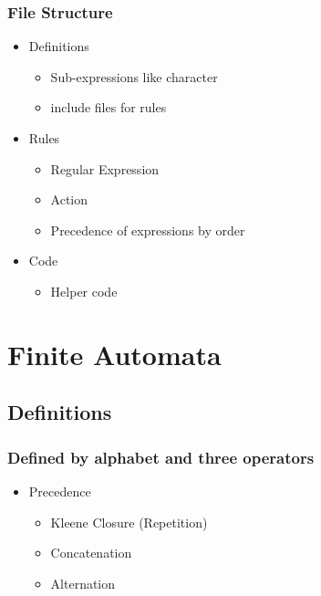 \documentclass[usepdftitle=false,professionalfonts,compress ]{beamer}
\begin{document}
{
\begin{frame}\frametitle{File Structure}

	\begin{itemize}
	\item Definitions

	\begin{itemize}
	\item Sub-expressions like character
			\item include files for rules
				\end{itemize}

			\item Rules

	\begin{itemize}
	\item Regular Expression
			\item Action
			\item Precedence of expressions by order
				\end{itemize}

			\item Code

	\begin{itemize}
	\item Helper code
				\end{itemize}

				\end{itemize}

\end{frame}}






\section{Finite Automata}
		
\subsection{Definitions}

{
\begin{frame}\frametitle{Defined by alphabet and three operators}

	\begin{itemize}
	\item Precedence

	\begin{itemize}
	\item Kleene Closure (Repetition)
			\item Concatenation
			\item Alternation
				\end{itemize}

				\end{itemize}

\end{frame}}
\end{document}
